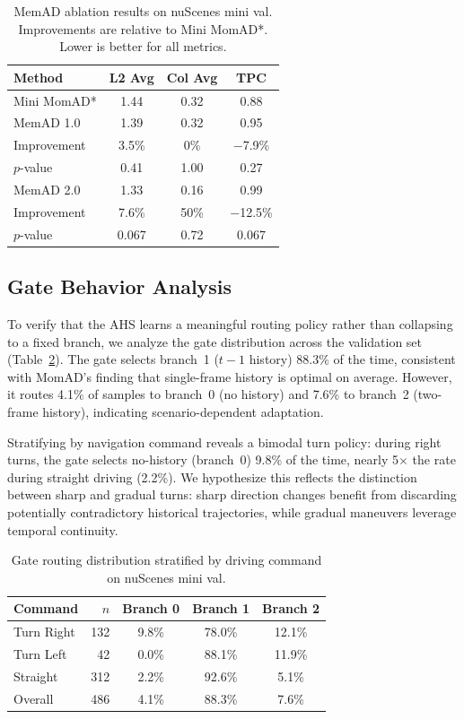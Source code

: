 \documentclass{article}
\begin{document}
\begin{table}[t]
\caption{MemAD ablation results on nuScenes mini val. Improvements are relative to Mini MomAD*. Lower is better for all metrics.}
\label{tab:memad}
\centering
\small
\begin{tabular}{@{}lccc@{}}
\toprule
Method & L2 Avg & Col Avg & TPC \\
\midrule
Mini MomAD* & 1.44 & 0.32 & 0.88 \\
\midrule
MemAD 1.0 & 1.39 & 0.32 & 0.95 \\
\quad Improvement & 3.5\% & 0\% & $-$7.9\% \\
\quad $p$-value & 0.41 & 1.00 & 0.27 \\
\midrule
MemAD 2.0 & 1.33 & 0.16 & 0.99 \\
\quad Improvement & 7.6\% & 50\% & $-$12.5\% \\
\quad $p$-value & 0.067 & 0.72 & 0.067 \\
\bottomrule
\end{tabular}
\end{table}

\subsection{Gate Behavior Analysis}
\label{sec:gate}

To verify that the AHS learns a meaningful routing policy rather than collapsing to a fixed branch, we analyze the gate distribution across the validation set (Table~\ref{tab:gate}).
The gate selects branch~1 ($t{-}1$ history) 88.3\% of the time, consistent with MomAD's finding that single-frame history is optimal on average.
However, it routes 4.1\% of samples to branch~0 (no history) and 7.6\% to branch~2 (two-frame history), indicating scenario-dependent adaptation.

Stratifying by navigation command reveals a bimodal turn policy: during right turns, the gate selects no-history (branch~0) 9.8\% of the time, nearly 5$\times$ the rate during straight driving (2.2\%).
We hypothesize this reflects the distinction between sharp and gradual turns: sharp direction changes benefit from discarding potentially contradictory historical trajectories, while gradual maneuvers leverage temporal continuity.

\begin{table}[t]
\caption{Gate routing distribution stratified by driving command on nuScenes mini val.}
\label{tab:gate}
\centering
\small
\begin{tabular}{@{}lrccc@{}}
\toprule
Command & $n$ & Branch 0 & Branch 1 & Branch 2 \\
\midrule
Turn Right & 132 & 9.8\% & 78.0\% & 12.1\% \\
Turn Left & 42 & 0.0\% & 88.1\% & 11.9\% \\
Straight & 312 & 2.2\% & 92.6\% & 5.1\% \\
\midrule
Overall & 486 & 4.1\% & 88.3\% & 7.6\% \\
\bottomrule
\end{tabular}
\end{table}
\end{document}
